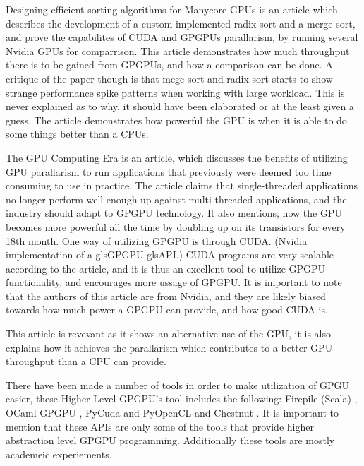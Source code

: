 Designing efficient sorting algorithms for Manycore \glspl{GPU} \cite{satish_2009_designing} is an article which describes the development of a custom implemented radix sort and a merge sort, and prove the capabilites of CUDA and \glspl{GPGPU} parallarism, by running several Nvidia \glspl{GPU} for comparrison. 
This article demonstrates how much throughput there is to be gained from \glspl{GPGPU}, and how a comparison can be done. 
A critique of the paper though is that mege sort and radix sort starts to show strange performance spike patterns when working with large workload. 
This is never explained as to why, it should have been elaborated or at the least given a guess.
The article demonstrates how powerful the \gls{GPU} is when it is able to do some things better than a \glspl{CPU}.

The GPU Computing Era \cite{gpu_computing_era} is an article, which discusses the benefits of utilizing \gls{GPU} parallarism to run applications that previously were deemed too time consuming to use in practice. 
The article claims that single-threaded applications no longer perform well enough up against multi-threaded applications, and the industry should adapt to GP\gls{GPU} technology. 
It also mentions, how the \gls{GPU} becomes more powerful all the time by doubling up on its transistors for every 18th month. 
One way of utilizing \gls{GPGPU} is through CUDA. (Nvidia implementation of a gls{GPGPU} gls{API}.)
CUDA programs are very scalable according to the article, and it is thus an excellent tool to utilize \gls{GPGPU} functionality, and encourages more ussage of \gls{GPGPU}.
It is important to note that the authors of this article are from Nvidia, and they are likely biased towards how much power a \gls{GPGPU} can provide, and how good CUDA is. 

This article is revevant as it shows an alternative use of the \gls{GPU}, it is also explains how it achieves the parallarism which contributes to a better \gls{GPU} throughput than a \gls{CPU} can provide.

There have been made a number of tools in order to make utilization of GPGU easier, these Higher Level GP\gls{GPU}'s tool includes the following: Firepile (Scala) \cite{2011_firepile}, OCaml GP\gls{GPU} \cite{bourgoin_2017_high}, PyCuda and PyOpenCL \cite{2012_pycuda_pyopencl} and Chestnut \cite{stromme_2012_chestnut}.
It is important to mention that these \glspl{API} are only some of the tools that provide higher abstraction level GPGPU programming. 
Additionally these tools are mostly academeic experiements.

